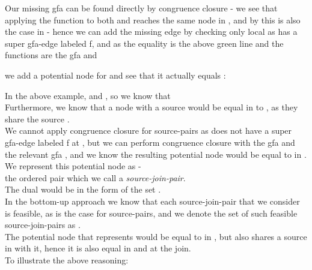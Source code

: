 



Our missing gfa can be found directly by congruence closure - we see that applying the function  
to both  and  reaches the same node in , and by  this is also the case in  - hence we can add the missing edge by checking only local 
as  has a super gfa-edge labeled f, and as 
the equality is the above green line and the functions are
the gfa  
and  

we add a potential node for  
and see that it actually equals :




In the above example,  and , so we know that 
\\
Furthermore, we know that a node with a source  would be equal in  to , 
as they share the  source .\\
We cannot apply congruence closure for source-pairs as  does not have a super gfa-edge labeled f at ,
but we can perform congruence closure with the  gfa  and the relevant gfa , and we know the resulting potential node would be equal to  in .\\
We represent this potential node as  - \\
the ordered pair  which we call a \emph{source-join-pair}.\\
The dual would be in the form  of the set .\\
In the bottom-up approach we know that each source-join-pair that we consider is feasible, as is the case for source-pairs, 
and we denote the set of such feasible source-join-pairs as .\\
The potential  node that  represents would be equal to  in ,
but also shares a source in  with it, hence it is also equal in  and at the join.\\
To illustrate the above reasoning:




